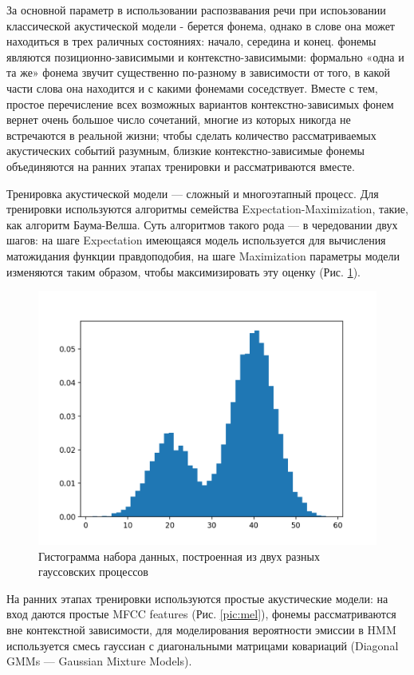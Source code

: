 За основной параметр в использовании распозвавания речи при испоьзовании классической акустической модели - 
берется фонема, однако в слове она может находиться в трех раличных состояниях: начало, середина и конец.
фонемы являются позиционно-зависимыми и контекстно-зависимыми: формально «одна и та же» фонема звучит существенно по-разному в зависимости от того, 
в какой части слова она находится и с какими фонемами соседствует. Вместе с тем, простое перечисление всех возможных вариантов контекстно-зависимых фонем 
вернет очень большое число сочетаний, многие из которых никогда не встречаются в реальной жизни; чтобы сделать количество рассматриваемых акустических событий разумным, 
близкие контекстно-зависимые фонемы объединяются на ранних этапах тренировки и рассматриваются вместе.

Тренировка акустической модели — сложный и многоэтапный процесс. Для тренировки используются алгоритмы семейства Expectation-Maximization, такие, как алгоритм Баума-Велша. 
Суть алгоритмов такого рода — в чередовании двух шагов: на шаге Expectation имеющаяся модель используется для вычисления матожидания функции правдоподобия, 
на шаге Maximization параметры модели изменяются таким образом, чтобы максимизировать эту оценку 
(Рис. \ref{pic:expectmax}). 

\begin{figure}[h]
\includegraphics[width=0.75\columnwidth]{./img/expect_max.png}
\centering
\caption{Гистограмма набора данных, построенная из двух разных гауссовских процессов}
\label{pic:expectmax}
\end{figure}

На ранних этапах тренировки используются простые акустические 
модели: на вход даются простые MFCC features
(Рис. \ref{pic:mel}), фонемы рассматриваются вне контекстной зависимости, для моделирования вероятности эмиссии в HMM используется смесь 
гауссиан с диагональными матрицами ковариаций (Diagonal GMMs — Gaussian Mixture Models).

